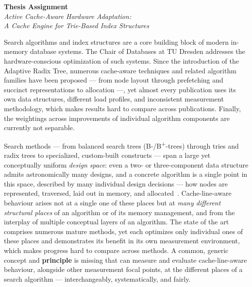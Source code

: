 {\large\textbf{Thesis Assignment}}\\[0.4em]
{\itshape Active Cache-Aware Hardware Adaptation:\\ A Cache Engine for Trie-Based Index Structures\/}

\bigskip
{}
Search algorithms and index structures are a core building block of modern in-memory database
systems. The Chair of Databases at TU Dresden addresses the hardware-conscious optimization of such
systems. Since the introduction of the Adaptive Radix Tree, numerous cache-aware techniques and related algorithm families have been
proposed --- from node layout through prefetching and succinct representations to allocation ---,
yet almost every publication uses its own data structures, different load profiles, and inconsistent
measurement methodology, which makes results hard to compare across publications. Finally, the
weightings across improvements of individual algorithm components are currently not separable.

Search methods --- from balanced search trees (B-/B\textsuperscript{+}-trees) through tries and
radix trees to specialized, custom-built constructs --- span a large yet conceptually uniform
\emph{design space}: even a
two- or three-component data structure admits astronomically many designs, and a concrete algorithm
is a single point in this space, described by many individual design decisions --- how nodes are
represented, traversed, laid out in memory, and allocated~\cite{idreos2018periodic, idreos2018datacalculator}. Cache-line-aware behaviour arises not at a
single one of these places but at \emph{many different structural places} of an algorithm or of its
memory management, and from the interplay of multiple conceptual layers of an algorithm. The state
of the art comprises numerous mature methods, yet each optimizes only
individual ones of these places and demonstrates its benefit in its own measurement environment,
which makes progress hard to compare across methods. A common, generic concept and
\textbf{principle} is missing that can measure and evaluate cache-line-aware behaviour, alongside
other measurement focal points, at the different places of a search algorithm --- interchangeably,
systematically, and fairly.

